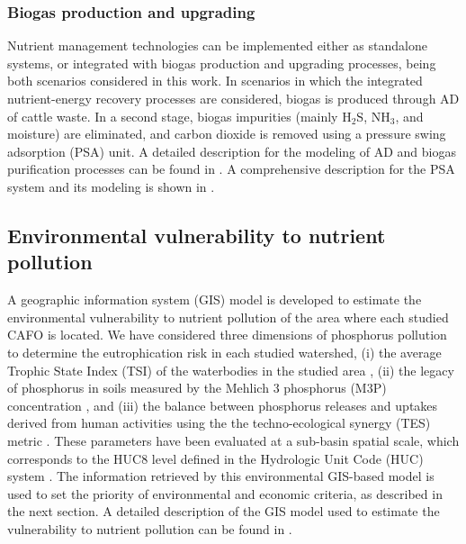 \begin{refsection}[referencesCh5]
\subsubsection{Biogas production and upgrading}
Nutrient management technologies can be implemented either as standalone systems, or integrated with biogas production and upgrading processes, being both scenarios considered in this work. In scenarios in which the integrated nutrient-energy recovery processes are considered, biogas is produced through AD of cattle waste. In a second stage, biogas impurities (mainly $\text{H}_2 \text{S}$, $\text{NH}_3$, and moisture) are eliminated, and carbon dioxide is removed using a pressure swing adsorption (PSA) unit. A detailed description for the modeling of AD and biogas purification processes can be found in \citet{Leon}. A comprehensive description for the PSA system and its modeling is shown in \citet{MartinHernandez}.

\subsection{Environmental vulnerability to nutrient pollution}
A geographic information system (GIS) model is developed to estimate the environmental vulnerability to nutrient pollution of the area where each studied CAFO is located. We have considered three dimensions of phosphorus pollution to determine the eutrophication risk in each studied watershed, (i) the average Trophic State Index (TSI) of the waterbodies in the studied area \citep{carlson_trophic_1977}, (ii) the legacy of phosphorus in soils measured by the Mehlich 3 phosphorus (M3P) concentration \citep{Espinoza2006}, and (iii) the balance between phosphorus releases and uptakes derived from human activities using the the techno-ecological synergy (TES) metric \citep{TESmetric}. These parameters have been evaluated at a sub-basin spatial scale, which corresponds to the HUC8 level defined in the Hydrologic Unit Code (HUC) system \citep{HUC8}. The information retrieved by this environmental GIS-based model is used to set the priority of environmental and economic criteria, as described in the next section. A detailed description of the GIS model used to estimate the vulnerability to nutrient pollution can be found in \citet{Tool}.


\end{refsection}
